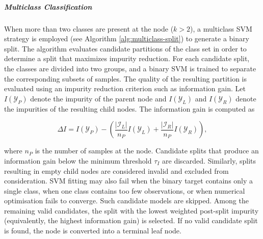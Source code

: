 \subparagraph{Multiclass Classification}\label{multiclass-classification}

When more than two classes are present at the node (\(k > 2\)), a multiclass SVM strategy is employed (see Algorithm \ref{alg:multiclass-split}) to generate a binary split. The algorithm evaluates candidate partitions of the class set in order to determine a split that maximizes impurity reduction. For each candidate split, the classes are divided into two groups, and a binary SVM is trained to separate the corresponding subsets of samples. The quality of the resulting partition is evaluated using an impurity reduction criterion such as information gain. Let \(I(\mathcal{Y}_P)\) denote the impurity of the parent node and \(I(\mathcal{Y}_L)\) and \(I(\mathcal{Y}_R)\) denote the impurities of the resulting child nodes. The information gain is computed as

\[
\Delta I = I(\mathcal{Y}_P) -
\left(
\frac{|\mathcal{I}_L|}{n_P} I(\mathcal{Y}_L) +
\frac{|\mathcal{I}_R|}{n_P} I(\mathcal{Y}_R)
\right),
\]

where \(n_P\) is the number of samples at the node. Candidate splits that produce an information gain below the minimum threshold \(\tau_I\) are discarded. Similarly, splits resulting in empty child nodes are considered invalid and excluded from consideration. SVM fitting may also fail when the binary target contains only a single class, when one class contains too few observations, or when numerical optimisation fails to converge. Such candidate models are skipped. Among the remaining valid candidates, the split with the lowest weighted post-split impurity (equivalently, the highest information gain) is selected. If no valid candidate split is found, the node is converted into a terminal leaf node.

